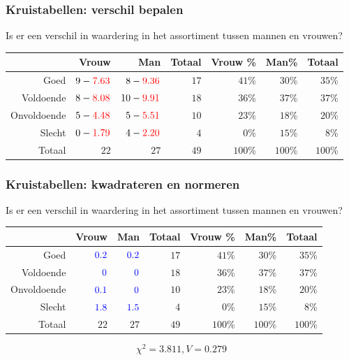 \documentclass{beamer}
\begin{document}
\begin{frame}
  \frametitle{Kruistabellen: verschil bepalen}
  Is er een verschil in waardering in het assortiment tussen mannen en vrouwen?
  \begin{adjustwidth}{-1.5em}{-1.5em}
    \begin{table}[h] \centering
      \begin{tabular}{@{}rrrrrrr@{}} \toprule
        & Vrouw & Man & Totaal & Vrouw \% & Man\%   & Totaal  \\ \midrule
        Goed        & $9 -\textcolor{red}{7.63}$     & $8 - \textcolor{red}{9.36}$   & $17$     & $41$\%  & $30$\% & $35$\% \\
        Voldoende   & $8 - \textcolor{red}{8.08}$   & $10 - \textcolor{red}{9.91}$  & $18$     & $36$\%  & $37$\%    & $37$\% \\
        Onvoldoende & $5 - \textcolor{red}{4.48}$    & $5 - \textcolor{red}{5.51}$  & $10$     & $23$\%  & $18$\% & $20$\% \\
        Slecht      & $0 - \textcolor{red}{1.79}$    & $4 - \textcolor{red}{2.20}$  & $4$      & $0$\%      & $15$\% & $8$\%  \\
        Totaal      & $22$    & $27$  & $49$     & $100$\%    & $100$\%   & $100$\%   \\
        \bottomrule
      \end{tabular}
    \end{table}
  \end{adjustwidth}
\end{frame}

\begin{frame}
  \frametitle{Kruistabellen: kwadrateren en normeren}
  Is er een verschil in waardering in het assortiment tussen mannen en vrouwen?
  \begin{table}[h] \centering
    \begin{tabular}{@{}rrrrrrr@{}} \toprule
                  & Vrouw                   & Man                     & Totaal & Vrouw \% & Man\%   & Totaal  \\
      \midrule
      Goed        & $\textcolor{blue}{0.2}$ & $\textcolor{blue}{0.2}$ & $17$   & $41$\%   & $30$\%  & $35$\% \\
      Voldoende   & $\textcolor{blue}{0}$   & $\textcolor{blue}{0}$   & $18$   & $36$\%   & $37$\%  & $37$\% \\
      Onvoldoende & $\textcolor{blue}{0.1}$ & $\textcolor{blue}{0}$   & $10$   & $23$\%   & $18$\%  & $20$\% \\
      Slecht      & $\textcolor{blue}{1.8}$ & $\textcolor{blue}{1.5}$ & $4$    & $0$\%    & $15$\%  & $8$\%  \\
      Totaal      & $22$                    & $27$                    & $49$   & $100$\%  & $100$\% & $100$\%   \\
      \bottomrule
    \end{tabular}
  \end{table}
  \[ \chi^{2} = 3.811, V= 0.279 \]
\end{frame}
\end{document}
